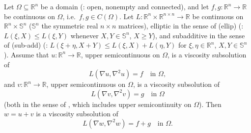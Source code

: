 \begin{theorem}
Let $\Omega\subseteq\mathbb R^n$ be a domain (: open, nonempty and connected), and let $f,g:\mathbb R^n\to\mathbb R$ be continuous on $\Omega$, i.e.\ $f,g\in C(\Omega)$. Let $L:\mathbb R^n\times\mathbb R^{n\times n}\to\mathbb R$ be continuous on $\mathbb R^n\times\mathbb S^n$ ($\mathbb S^n$ the symmetric real $n\times n$ matrices), elliptic in the sense of (ellip) (: $L(\xi,X)\le L(\xi,Y)$ whenever $X,Y\in\mathbb S^n$, $X\ge Y$), and subadditive in the sense of (sub-add) (: $L(\xi+\eta,X+Y)\le L(\xi,X)+L(\eta,Y)$ for $\xi,\eta\in\mathbb R^n$, $X,Y\in\mathbb S^n$). Assume that $u:\mathbb R^n\to\mathbb R$, upper semicontinuous on $\Omega$, is a viscosity subsolution of
\[
L(\nabla u,\nabla^2u)=f\quad\text{in }\Omega,
\]
and $v:\mathbb R^n\to\mathbb R$, upper semicontinuous on $\Omega$, is a viscosity subsolution of
\[
L(\nabla v,\nabla^2v)=g\quad\text{in }\Omega
\]
(both in the sense of , which includes upper semicontinuity on $\Omega$). Then $w=u+v$ is a viscosity subsolution of
\[
L(\nabla w,\nabla^2w)=f+g\quad\text{in }\Omega .
\]
\end{theorem}
